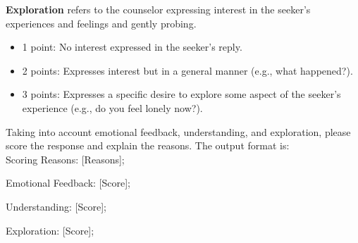 \begin{figure*}
\begin{tcolorbox}[title = {Prompt for Empathy Analysis}]
\textbf{Exploration} refers to the counselor expressing interest in the seeker's experiences and feelings and gently probing.
\begin{itemize}
    \item 1 point: No interest expressed in the seeker's reply.
    \item 2 points: Expresses interest but in a general manner (e.g., what happened?).
    \item 3 points: Expresses a specific desire to explore some aspect of the seeker's experience (e.g., do you feel lonely now?).
\end{itemize}
Taking into account emotional feedback, understanding, and exploration, please score the response and explain the reasons. The output format is:
\ \\
Scoring Reasons: [Reasons]; 

Emotional Feedback: [Score]; 

Understanding: [Score]; 

Exploration: [Score]; 
\end{tcolorbox}

\end{figure*}